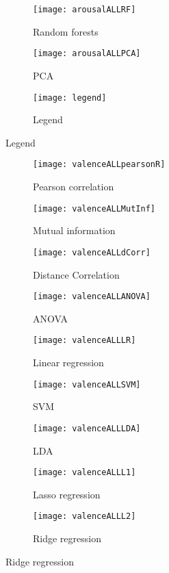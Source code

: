 \begin{figure}[!tbp]
  \begin{subfigure}[b]{0.3\textwidth}
    \texttt{[image: arousalALLRF]}
    \caption{Random forests}
  \end{subfigure}
  \hfill
  \begin{subfigure}[b]{0.3\textwidth}
    \texttt{[image: arousalALLPCA]}
    \caption{PCA}
  \end{subfigure}
  \hfill
  \begin{subfigure}[b]{0.3\textwidth}
    \texttt{[image: legend]}
    \caption{Legend\label{arousalpieslegend}}
  \end{subfigure}
\end{figure}

\clearpage

\begin{figure}[!tbp]
  \centering
  \caption{Selection features for valence classification.\label{valencepies}}
  \begin{subfigure}[b]{0.3\textwidth}
    \texttt{[image: valenceALLpearsonR]}
    \caption{Pearson correlation}
  \end{subfigure}
  \hfill
  \begin{subfigure}[b]{0.3\textwidth}
    \texttt{[image: valenceALLMutInf]}
    \caption{Mutual information}
  \end{subfigure}
  \hfill
  \begin{subfigure}[b]{0.3\textwidth}
    \texttt{[image: valenceALLdCorr]}
    \caption{Distance Correlation}
  \end{subfigure}
  
  \begin{subfigure}[b]{0.3\textwidth}
    \texttt{[image: valenceALLANOVA]}
    \caption{ANOVA}
  \end{subfigure}
  \hfill
  \begin{subfigure}[b]{0.3\textwidth}
    \texttt{[image: valenceALLLR]}
    \caption{Linear regression}
  \end{subfigure}
  \hfill
  \begin{subfigure}[b]{0.3\textwidth}
    \texttt{[image: valenceALLSVM]}
    \caption{SVM}
  \end{subfigure}
  
  \begin{subfigure}[b]{0.3\textwidth}
    \texttt{[image: valenceALLLDA]}
    \caption{LDA}
  \end{subfigure}
  \hfill
  \begin{subfigure}[b]{0.3\textwidth}
    \texttt{[image: valenceALLL1]}
    \caption{Lasso regression}
  \end{subfigure}
  \hfill
  \begin{subfigure}[b]{0.3\textwidth}
    \texttt{[image: valenceALLL2]}
    \caption{Ridge regression}
  \end{subfigure}
  

\end{figure}

